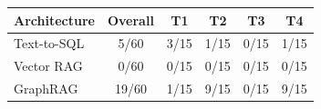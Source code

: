 \begin{tabular}{@{}lccccc@{}}
\toprule
\textbf{Architecture} & \textbf{Overall} & \textbf{T1} & \textbf{T2} & \textbf{T3} & \textbf{T4} \\
\midrule
Text-to-SQL & 5/60 & 3/15 & 1/15 & 0/15 & 1/15 \\
Vector RAG & 0/60 & 0/15 & 0/15 & 0/15 & 0/15 \\
GraphRAG & 19/60 & 1/15 & 9/15 & 0/15 & 9/15 \\
\bottomrule
\end{tabular}
